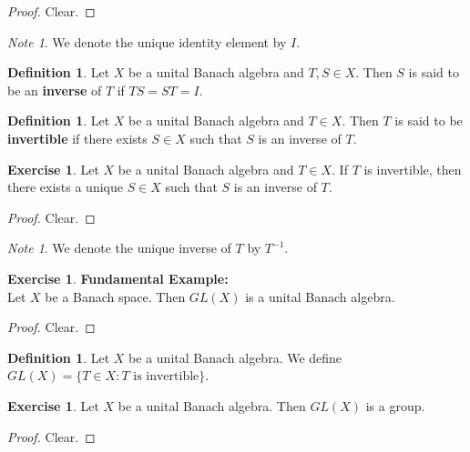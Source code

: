 \documentclass[12pt]{amsart}
\theoremstyle{definition}
\newtheorem{defn}[definition]{Definition}
\theoremstyle{remark}
\newtheorem{note}[remark]{Note}
\theoremstyle{definition}
\newtheorem{ex}[definition]{Exercise}
\begin{document}
		\begin{proof}
		Clear.
		\end{proof}
		
		\begin{note}
		We denote the unique identity element by $I$.
		\end{note}
		
		\begin{defn}
		Let $X$ be a unital Banach algebra and $T,S \in X$. Then $S$ is said to be an 
		\textbf{inverse} of $T$ if $TS=ST = I$.
		\end{defn}

		\begin{defn}
		Let $X$ be a unital Banach algebra and $T \in X$. 			Then $T$ is said to be 
		\textbf{invertible} if there exists $S \in X$ such 		that $S$ is an inverse of $T$.
		\end{defn}
		
		\begin{ex}
		Let $X$ be a unital Banach algebra and $T \in X$. If $T$ is invertible, then there exists a unique $S \in X$ such that $S$ is an inverse of $T$.
		\end{ex}
		
		\begin{proof}
		Clear.
		\end{proof}
		
		\begin{note}
		We denote the unique inverse of $T$ by $T^{-1}$.
		\end{note}
		
			
	\begin{ex}\textbf{Fundamental Example:} \\
	Let $X$ be a Banach space. Then $GL(X)$ is a unital Banach algebra.
	\end{ex}
	
	\begin{proof}
	Clear.
	\end{proof}
		
		\begin{defn}
		Let $X$ be a unital Banach algebra. We define $GL(X) = \{T \in X: T \text{ is invertible}\}$.
		\end{defn}
		
		\begin{ex}
		Let $X$ be a unital Banach algebra. Then $GL(X)$ is a group.  
	\end{ex}
	
	\begin{proof}
	Clear.
	\end{proof}
	
\end{document}
